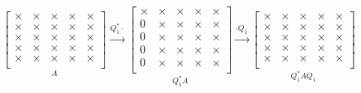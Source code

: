 \documentclass[a4paper]{article}
\begin{document}
\begin{equation*}
    \underset{A}{
    \begin{bmatrix}
        \times & \times & \times & \times & \times \\
        \times & \times & \times & \times & \times \\
        \times & \times & \times & \times & \times \\
        \times & \times & \times & \times & \times \\
        \times & \times & \times & \times & \times \\
    \end{bmatrix}}
    \xrightarrow{Q_1^* \cdot}
    \underset{Q_1^* A}{
    \begin{bmatrix}
        \times & \times & \times & \times & \times \\
        0 & \times & \times & \times & \times \\
        0 & \times & \times & \times & \times \\
        0 & \times & \times & \times & \times \\
        0 & \times & \times & \times & \times \\
    \end{bmatrix}}
    \xrightarrow{\cdot Q_1}
    \underset{Q_1^* A Q_1}{
    \begin{bmatrix}
        \times & \times & \times & \times & \times \\
        \times & \times & \times & \times & \times \\
        \times & \times & \times & \times & \times \\
        \times & \times & \times & \times & \times \\
        \times & \times & \times & \times & \times \\
    \end{bmatrix}}
\end{equation*}
\end{document}
